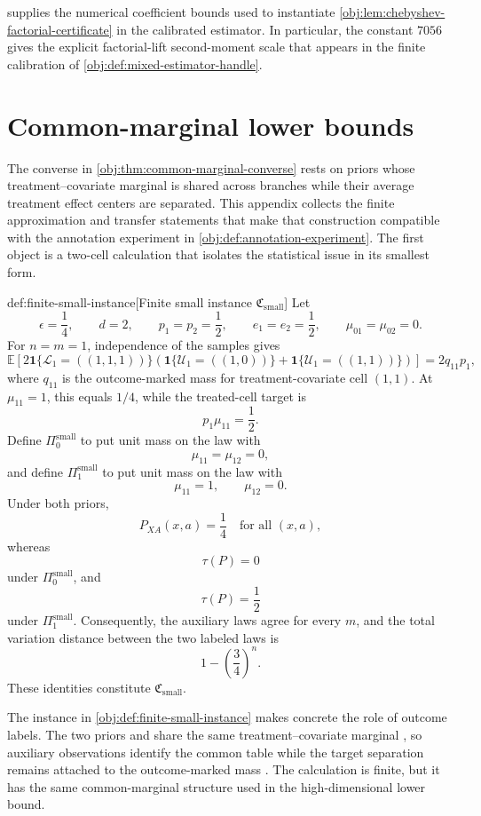 \documentclass[11pt]{article}
\begin{document}
 supplies the numerical coefficient bounds used to instantiate \cref{obj:lem:chebyshev-factorial-certificate} in the calibrated estimator. In particular, the constant \(7056\) gives the explicit factorial-lift second-moment scale that appears in the finite calibration of \cref{obj:def:mixed-estimator-handle}.


\section{Common-marginal lower bounds}\label{sec:appendix-lower}

The converse in \cref{obj:thm:common-marginal-converse} rests on priors whose treatment--covariate marginal is shared across branches while their average treatment effect centers are separated. This appendix collects the finite approximation and transfer statements that make that construction compatible with the annotation experiment in \cref{obj:def:annotation-experiment}. The first object is a two-cell calculation that isolates the statistical issue in its smallest form.

\begin{definitionv}{def:finite-small-instance}[Finite small instance \(\mathfrak C_{\mathrm{small}}\)]
Let
\[
\epsilon=\frac14,\qquad d=2,\qquad p_1=p_2=\frac12,\qquad e_1=e_2=\frac12,\qquad \mu_{01}=\mu_{02}=0.
\]
For \(n=m=1\), independence of the samples gives
\[
\mathbb E\!\left[
2\mathbf 1\{\mathcal L_1=((1,1,1))\}
\left(\mathbf 1\{\mathcal U_1=((1,0))\}+\mathbf 1\{\mathcal U_1=((1,1))\}\right)
\right]
=2q_{11}p_1,
\]
where \(q_{11}\) is the outcome-marked mass for treatment-covariate cell \((1,1)\). At \(\mu_{11}=1\), this equals \(1/4\), while the treated-cell target is
\[
p_1\mu_{11}=\frac12.
\]
Define \(\Pi_0^{\mathrm{small}}\) to put unit mass on the law with
\[
\mu_{11}=\mu_{12}=0,
\]
and define \(\Pi_1^{\mathrm{small}}\) to put unit mass on the law with
\[
\mu_{11}=1,\qquad \mu_{12}=0.
\]
Under both priors,
\[
P_{XA}(x,a)=\frac14
\quad\text{for all }(x,a),
\]
whereas
\[
\tau(P)=0
\]
under \(\Pi_0^{\mathrm{small}}\), and
\[
\tau(P)=\frac12
\]
under \(\Pi_1^{\mathrm{small}}\). Consequently, the auxiliary laws agree for every \(m\), and the total variation distance between the two labeled laws is
\[
1-\left(\frac34\right)^n.
\]
These identities constitute \(\mathfrak C_{\mathrm{small}}\).
\end{definitionv}

The instance in \cref{obj:def:finite-small-instance} makes concrete the role of outcome labels. The two priors  and  share the same treatment--covariate marginal , so auxiliary observations identify the common table while the target separation remains attached to the outcome-marked mass . The calculation  is finite, but it has the same common-marginal structure used in the high-dimensional lower bound.
\end{document}
